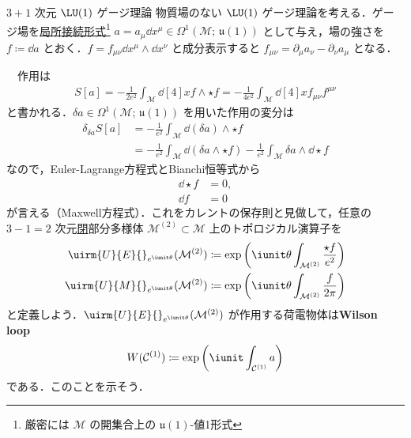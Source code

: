 \documentclass[TQFT_main]{subfiles}
\begin{document}
\begin{myexample}[label=ex:3-2]{$3+1$ 次元 $\LU(1)$ ゲージ理論}
    物質場のない $\LU(1)$ ゲージ理論を考える．ゲージ場を\hyperref[thm:local-connection]{局所接続形式}\footnote{厳密には $\mathcal{M}$ の開集合上の $\mathfrak{u}(1)$-値1形式} $a = a_\mu \dd{x^\mu} \in \Omega^1(\mathcal{M};\, \mathfrak{u}(1))$ として与え，場の強さを $f \coloneqq \dd{a}$ とおく．$f = f_{\mu\nu} \dd{x}^\mu \wedge \dd{x}^\nu$ と成分表示すると $f_{\mu\nu} = \partial_\mu a_\nu - \partial_\nu a_\mu$ となる．

    　作用は
    \begin{align}
        S[a] = - \frac{1}{2e^2} \int_{\mathcal{M}} \dd[4]{x} f \wedge \star f =  - \frac{1}{4e^2} \int_{\mathcal{M}} \dd[4]{x} f_{\mu\nu} f^{\mu\nu}
    \end{align}
    と書かれる．$\delta a \in \Omega^1(\mathcal{M};\, \mathfrak{u}(1))$ を用いた作用の変分は
    \begin{align}
        \delta_{\delta a} S[a] 
        &= -\frac{1}{e^2} \int_{\mathcal{M}}\dd(\delta a) \wedge \star f \\
        &= -\frac{1}{e^2} \int_{\mathcal{M}} \dd(\delta a\wedge \star f) - \frac{1}{e^2} \int_{\mathcal{M}} \delta a \wedge \dd \star f
    \end{align}
    なので，Euler-Lagrange方程式とBianchi恒等式から
    \begin{align}
        \dd \star f &= 0, \\
        \dd f &= 0
    \end{align}
    が言える（Maxwell方程式）．これをカレントの保存則と見做して，任意の $3-1 = 2$ 次元\underline{閉}部分多様体 $\mathcal{M}^{(2)} \subset \mathcal{M}$ 上のトポロジカル演算子を
    \begin{align}
        \uirm{U}{E}{}_{e^{\iunit\theta}} (\mathcal{M}^{(2)}) &\coloneqq \exp \left( \iunit \theta \int_{\mathcal{M}^{(2)}} \frac{\star f}{e^2} \right) \\
        \uirm{U}{M}{}_{e^{\iunit\theta}} (\mathcal{M}^{(2)}) &\coloneqq \exp \left( \iunit \theta \int_{\mathcal{M}^{(2)}} \frac{f}{2\pi} \right)
    \end{align}
    と定義しよう．$\uirm{U}{E}{}_{e^{\iunit\theta}} (\mathcal{M}^{(2)})$ が作用する荷電物体は\textbf{Wilson loop}
    \begin{align}
        W(\mathcal{C}^{(1)}) \coloneqq \exp \left( \iunit \int_{\mathcal{C}^{(1)}} a\right) 
    \end{align}
    である．このことを示そう．


\end{myexample}
\end{document}
